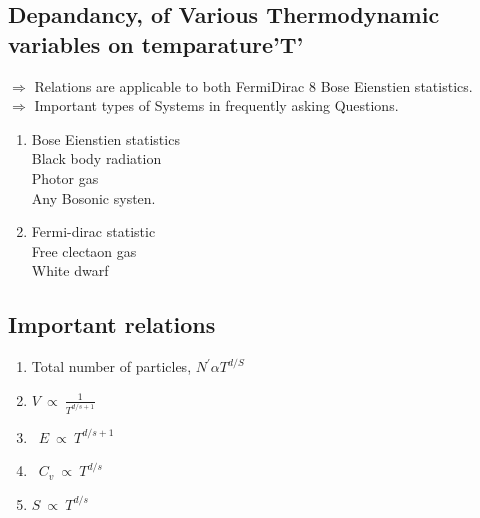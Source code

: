 \subsection	{Depandancy, of Various Thermodynamic variables on temparature'T'}
	$\Rightarrow$ Relations are applicable to both FermiDirac 8 Bose Eienstien statistics.\\
	$\Rightarrow$ Important types of Systems in frequently asking Questions.\\
\begin{enumerate}
\item Bose Eienstien statistics\\
Black body radiation\\
Photor gas\\
Any Bosonic systen.\\
\item Fermi-dirac statistic\\
Free clectaon gas\\
 White dwarf
\end{enumerate}
\subsection{Important relations}
\begin{enumerate}
\item Total number of particles, $N^{\prime} \alpha T^{d / S}$\\
\item$V\  \propto\  \frac{1}{T^{d/s+1}}$ \\
\item\  $E \ \propto \ T^{d / s+1}$\\
\item\  $C_{v} \ \propto\  T^{d / s}$\\
\item $S \ \propto\  T^{d / s}$	
\end{enumerate}


